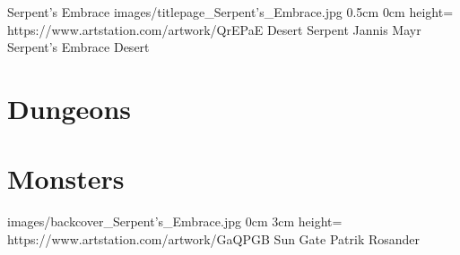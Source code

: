 \documentclass[letterpaper,openany,twoside,twocolumn]{book}
\begin{document}
	\regionTitlePage
		{Serpent's Embrace}
		{images/titlepage_Serpent's_Embrace.jpg}
		{0.5cm}
		{0cm}
		{height=\paperheight}
		{https://www.artstation.com/artwork/QrEPaE}
		{Desert Serpent}
		{Jannis Mayr}
		{Serpent's Embrace Desert}
	
	\tableofcontents
	
	\mainmatter
	
	\DungeonSheetGeometry
	\part{Dungeons}
	
	
	\MonsterSheetGeometry
	\part{Monsters}
	
	
	
	
	\regionLastPage
		{images/backcover_Serpent's_Embrace.jpg}
		{0cm}
		{3cm}
		{height=\paperheight}
		{https://www.artstation.com/artwork/GaQPGB}
		{Sun Gate}
		{Patrik Rosander}
		{}
\end{document}
